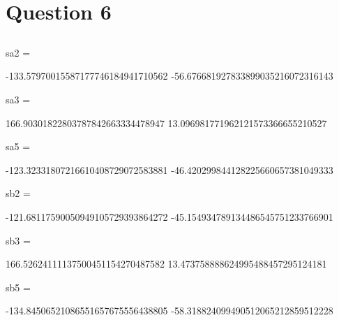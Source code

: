 \section{Question 6}
	\subsection{}
	\subsection{}
	sa2 =
	
	-133.57970015587177746184941710562
	-56.676681927833899035216072316143
	
	
	sa3 =
	
	166.90301822803787842663334478947
	13.096981771962121573366655210527
	
	
	sa5 =
	
	-123.32331807216610408729072583881
	-46.420299844128225660657381049333
	
	
	sb2 =
	
	-121.68117590050949105729393864272
	-45.154934789134486545751233766901
	
	
	sb3 =
	
	166.52624111137500451154270487582
	13.473758888624995488457295124181
	
	
	sb5 =
	
	-134.84506521086551657675556438805
	-58.318824099490512065212859512228
	\subsection{}
